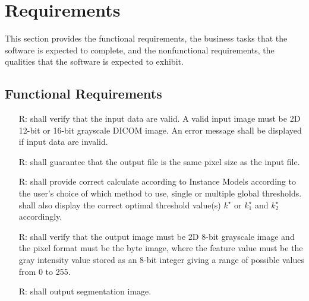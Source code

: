 \documentclass[12pt]{article}
\begin{document}
\section{Requirements}

This section provides the functional requirements, the business tasks that the
software is expected to complete, and the nonfunctional requirements, the
qualities that the software is expected to exhibit.

\subsection{Functional Requirements}

\noindent \begin{itemize}

\item[R\refstepcounter{reqnum}\thereqnum \label{R_Inputs}:] 
\progname{} shall verify that the input data are valid. A valid input image
must be 2D 12-bit or 16-bit grayscale DICOM image. An error message shall be
displayed if input data are invalid.

\item[R\refstepcounter{reqnum}\thereqnum \label{R_OutputInputs}:] 
\progname{} shall guarantee that the output file is the same pixel size as the
input file.

\item[R\refstepcounter{reqnum}\thereqnum \label{R_Calculate}:]
\progname{} shall provide correct calculate according to Instance Models
according to the user's choice of which method to use, single or multiple
global thresholds. \progname{} shall also display the correct optimal threshold
value(s) $k^{\star}$ or $k^{\star}_{1}$ and $k^{\star}_{2}$ accordingly.

\item[R\refstepcounter{reqnum}\thereqnum \label{R_VerifyOutput}:] \progname{}
  shall verify that the output image must be 2D 8-bit grayscale image and the
  pixel format must be the byte image, where the feature value must be the gray
  intensity value stored as an 8-bit integer giving a range of possible values
  from 0 to 255. 

\item[R\refstepcounter{reqnum}\thereqnum \label{R_Outputk}:] 
\progname{} shall output segmentation image.

\end{itemize}
\end{document}
